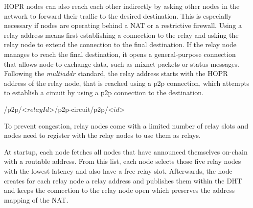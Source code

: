 HOPR nodes can also reach each other indirectly by asking other nodes in the network to forward their traffic to the desired destination. This is especially necessary if nodes are operating behind a NAT or a restrictive firewall. Using a relay address means first establishing a connection to the relay and asking the relay node to extend the connection to the final destination. If the relay node manages to reach the final destination, it opens a general-purpose connection that allows node to exchange data, such as mixnet packets or status messages. Following the \textit{multiaddr} standard, the relay address starts with the HOPR address of the relay node, that is reached using a p2p connection, which attempts to establish a circuit by using a p2p connection to the destination.

\begin{center}
    \textsf{/p2p/}\textless\textsf{$relayId$}\textgreater\textsf{/p2p-circuit/p2p/}\textless{}\textsf{$id$}\textgreater{}
\end{center}

To prevent congestion, relay nodes come with a limited number of relay slots and nodes need to register with the relay nodes to use them as relays.

At startup, each node fetches all nodes that have announced themselves on-chain with a routable address. From this list, each node selects those five relay nodes with the lowest latency and also have a free relay slot. Afterwards, the node creates for each relay node a relay address and publishes them within the DHT and keeps the connection to the relay node open which preserves the address mapping of the NAT.
